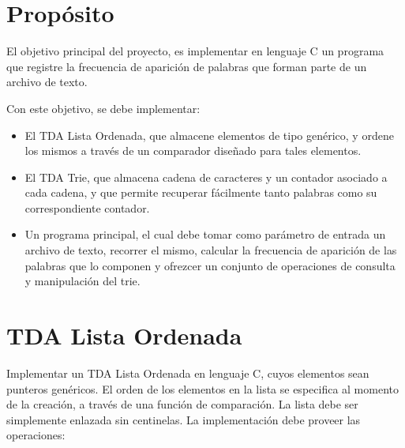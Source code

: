 \documentclass[12pt,a4paper]{article}
\begin{document}

\section*{Propósito}
El objetivo principal del proyecto, es implementar en lenguaje C un programa que registre la frecuencia de aparición de palabras que forman parte de un archivo de texto. 

Con este objetivo, se debe implementar:
\begin{itemize}
	
	\item El TDA Lista Ordenada, que almacene elementos de tipo genérico, y ordene los mismos a través de un comparador diseñado para tales elementos.
	
	\item El TDA Trie, que almacena cadena de caracteres y un contador asociado a cada cadena, y que permite recuperar fácilmente tanto palabras como su correspondiente contador.
	
	\item Un programa principal, el cual debe tomar como parámetro de entrada un archivo de texto, recorrer el mismo, calcular la frecuencia de aparición de las palabras que lo componen y ofrezcer un conjunto de operaciones de consulta y manipulación del trie.
	
\end{itemize}

\section{TDA Lista Ordenada}
Implementar un TDA Lista Ordenada en lenguaje C, cuyos elementos sean punteros genéricos. El orden de los elementos en la lista se especifica al momento de la creación, a través de una función de comparación. La lista debe ser simplemente enlazada sin centinelas. La implementación debe proveer las operaciones:
\end{document}
